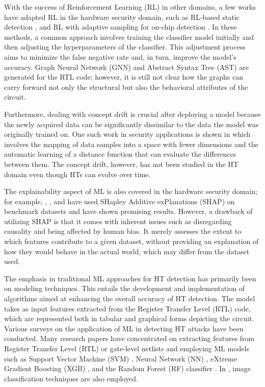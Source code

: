 With the success of Reinforcement Learning (RL) in other domains, a few works have adapted RL in the hardware security domain, such as RL-based static detection \cite{gohil2022attrition}, and RL with adaptive sampling for on-chip detection \cite{chen2023adatest}. In these methods, a common approach involves training the classifier model initially and then adjusting the hyperparameters of the classifier. This adjustment process aims to minimize the false negative rate and, in turn, improve the model's accuracy. Graph Neural Network (GNN) \cite{alrahis2022embracing,hepp2022golden} and Abstract Syntax Tree (AST) \cite{han2019hardware} are generated for the RTL code; however, it is still not clear how the graphs can carry forward not only the structural but also the behavioral attributes of the circuit.

Furthermore, dealing with concept drift is crucial after deploying a model because the newly acquired data can be significantly dissimilar to the data the model was originally trained on. One such work in security applications is shown in \cite{yang2021cade} which involves the mapping of data samples into a space with fewer dimensions and the automatic learning of a distance function that can evaluate the differences between them. The concept drift, however, has not been studied in the HT domain even though HTs can evolve over time.

The explainability aspect of ML is also covered in the hardware security domain; for example, \cite{pan2023hardware}, \cite{downing2021deepreflect}, and \cite{severi2021explanation} have used SHapley Additive exPlanations (SHAP) on benchmark datasets and have shown promising results. However, a drawback of utilizing SHAP is that it comes with inherent issues such as disregarding causality and being affected by human bias. It merely assesses the extent to which features contribute to a given dataset, without providing an explanation of how they would behave in the actual world, which may differ from the dataset used.

The emphasis in traditional ML approaches for HT detection has primarily been on modeling techniques. This entails the development and implementation of algorithms aimed at enhancing the overall accuracy of HT detection. The model takes as input features extracted from the Register Transfer Level (RTL) code, which are represented both in tabular and graphical forms depicting the circuit. Various surveys on the application of ML in detecting HT attacks have been conducted.  
Many research papers have concentrated on extracting features from Register Transfer Level (RTL) or gate-level netlists and employing ML models such as Support Vector Machine (SVM) \cite{bao2014application}, Neural Network (NN) \cite{hasegawa2017hardware}, eXtreme Gradient Boosting (XGB) \cite{dong2019machine}, and the Random Forest (RF) classifier \cite{hasegawa2017trojan}. In \cite{ashok2022hardware}, image classification techniques are also employed. %

